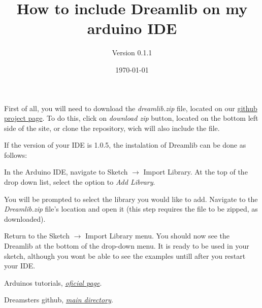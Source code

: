 \documentclass[12pt]{article}
\title{How to include Dreamlib on my arduino IDE}
\subtitle{Version 0.1.1}
\date{\today}
\begin{document}
\maketitle

First of all, you will need to download the \textit{dreamlib.zip} file, located on our \href{https://github.com/dreamster/arduino_lib}{github project page}. To do this, click on  \textit{download zip} button, located on the bottom left side of the site, or clone the repository, wich will also include the file.

If the version of your IDE is 1.0.5, the instalation of Dreamlib can be done as follows:

In the Arduino IDE, navigate to Sketch $\rightarrow$ Import Library. At the top of the drop down list, select the option to \textit{Add Library}. 

You will be prompted to select the library you would like to add. Navigate to the \textit{Dreamlib.zip} file's location and open it (this step requires the file to be zipped, as downloaded).

Return to the Sketch $\rightarrow$ Import Library menu. You should now see the Dreamlib at the bottom of the drop-down menu. It is ready to be used in your sketch, although you wont be able to see the examples untill after you restart your IDE.

\begin{thebibliography}{1}

  Arduinos tutorials,
  \emph{\href{http://arduino.cc/en/Guide/Libraries}{oficial page}}.

	
  Dreamsters github,
  \emph{\href{https://github.com/dreamster}{main directory}}.

\end{thebibliography}
\end{document}
